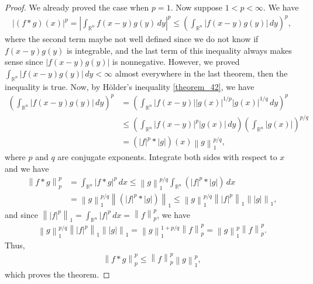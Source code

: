 \documentclass[11pt]{book}
\theoremstyle{definition}
\numberwithin{equation}{chapter}
\begin{document}
\begin{proof}
We already proved the case when $p = 1$. Now suppose $1 < p < \infty$. We have
\begin{align*}
    \left|(f*g)(x)\right|^p = \left|\int_{\mathbb{R}^n} f(x-y)g(y) \,dy\right|^p \leq \left(\int_{\mathbb{R}^n} \left|f(x-y)g(y) \right|\,dy\right)^p,
\end{align*}
where the second term maybe not well defined since we do not know if $f(x-y)g(y)$ is integrable, and the last term of this inequality always makes sense since $\left|f(x-y)g(y) \right|$ is nonnegative. However, we proved $\int_{\mathbb{R}^n} \left|f(x-y)g(y) \right|\,dy < \infty$ almost everywhere in the last theorem, then the inequality is true. Now, by Hölder's inequality \ref{theorem_42}, we have
\begin{align*}
    \left(\int_{\mathbb{R}^n} \left|f(x-y)g(y) \right|\,dy\right)^p & = \left(\int_{\mathbb{R}^n} \left|f(x-y)\right| \left|g(x)\right|^{1/p} \left|g(x)\right|^{1/q} \,dy\right)^p \\
    & \leq \left(\int_{\mathbb{R}^n} \left|f(x-y)\right|^p \left|g(x)\right| \,dy\right) \left(\int_{\mathbb{R}^n} \left|g(x)\right|\right)^{p/q} \\
    & = (\left|f\right|^p * \left|g\right|)(x) \left\|g\right\|_1^{p/q},
\end{align*}
where $p$ and $q$ are conjugate exponents. Integrate both sides with respect to $x$ and we have
\begin{align*}
    \left\|f*g\right\|_p^p & = \int_{\mathbb{R}^n} \left|f*g\right|^p\,dx \leq \left\|g\right\|_1^{p/q} \int_{\mathbb{R}^n} (\left|f\right|^p * \left|g\right|)\,dx \\
    & = \left\|g\right\|_1^{p/q} \left\| (\left|f\right|^p * \left|g\right|) \right\|_1 \leq \left\|g\right\|_1^{p/q} \left\| \left|f\right|^p \right\|_1 \left\| \left|g\right| \right\|_1,
\end{align*}
and since $\left\| \left|f\right|^p \right\|_1 = \int_{\mathbb{R}^n} \left|f\right|^p\,dx = \left\|f \right\|_p^p$, we have
\begin{align*}
    \left\|g\right\|_1^{p/q} \left\| \left|f\right|^p \right\|_1 \left\| \left|g\right| \right\|_1 = \left\|g\right\|_1^{1+p/q} \left\|f \right\|_p^p = \left\|g\right\|_1^{p} \left\|f \right\|_p^p.
\end{align*}
Thus, 
\begin{align*}
    \left\|f*g\right\|_p^p \leq \left\|f \right\|_p^p \left\|g\right\|_1^{p},
\end{align*}
which proves the theorem.
\end{proof}
\end{document}
